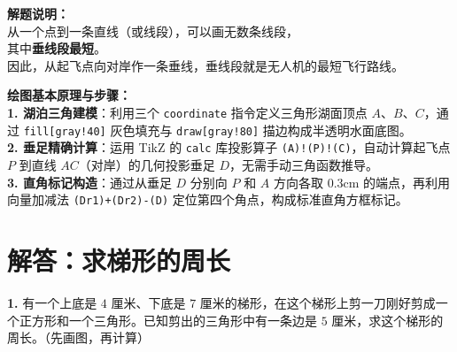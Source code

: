 \vspace{0.6cm}

{\small\color{gray}
\textbf{解题说明：}\\
从一个点到一条直线（或线段），可以画无数条线段，\\
其中\textbf{垂线段最短}。\\
因此，从起飞点向对岸作一条垂线，垂线段就是无人机的最短飞行路线。
}

\vspace{0.6cm}

{\small\color{blue!70!black}
\textbf{绘图基本原理与步骤：}\\
\textbf{1. 湖泊三角建模}：利用三个 \texttt{coordinate} 指令定义三角形湖面顶点 $A$、$B$、$C$，通过 \texttt{fill[gray!40]} 灰色填充与 \texttt{draw[gray!80]} 描边构成半透明水面底图。\\
\textbf{2. 垂足精确计算}：运用 TikZ 的 \texttt{calc} 库投影算子 \texttt{(A)!(P)!(C)}，自动计算起飞点 $P$ 到直线 $AC$（对岸）的几何投影垂足 $D$，无需手动三角函数推导。\\
\textbf{3. 直角标记构造}：通过从垂足 $D$ 分别向 $P$ 和 $A$ 方向各取 0.3cm 的端点，再利用向量加减法 \texttt{(Dr1)+(Dr2)-(D)} 定位第四个角点，构成标准直角方框标记。
}


\newpage



\section{解答：求梯形的周长}

\vspace{0.4cm}

\noindent\textbf{1.} 有一个上底是 $4$ 厘米、下底是 $7$ 厘米的梯形，在这个梯形上剪一刀刚好剪成一个正方形和一个三角形。已知剪出的三角形中有一条边是 $5$ 厘米，求这个梯形的周长。（先画图，再计算）

\vspace{0.8cm}

